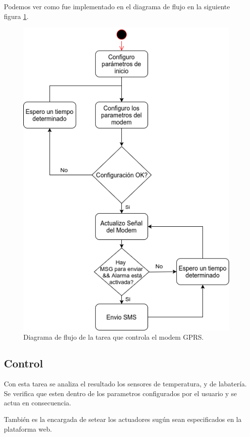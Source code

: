 Podemos ver como fue implementado en el diagrama de flujo en la siguiente figura \ref{fig:modem_task}.

\begin{figure}[!htb]
  \centering
  \includegraphics[scale=.5]{./Figures/modem_task.png}
  \caption{Diagrama de flujo de la tarea que controla el modem GPRS.}
  \label{fig:modem_task}
\end{figure}


\subsection*{Control}
Con esta tarea se analiza el resultado los sensores de temperatura, y de labatería. Se verifica que esten dentro de los parametros configurados por el usuario y se actua en consecuencia.

También es la encargada de setear los actuadores sugún sean especificados en la plataforma web.

